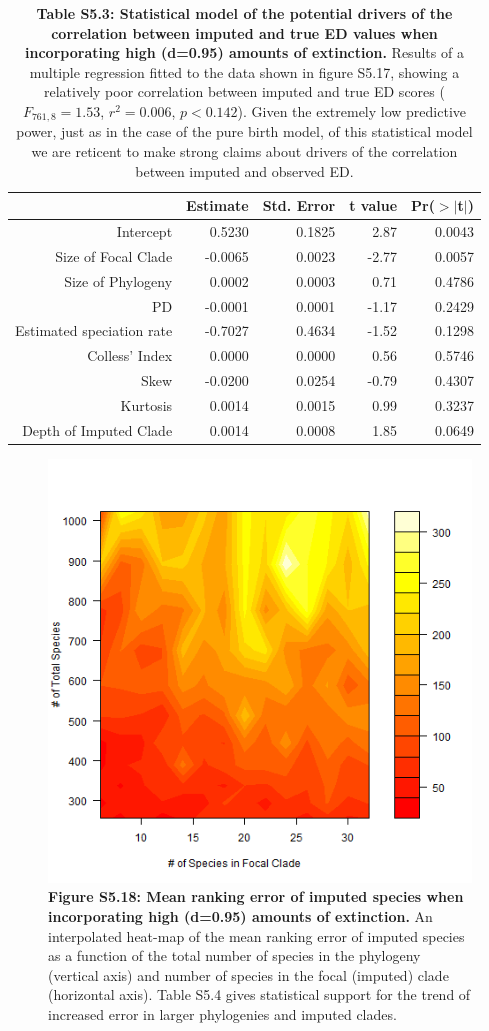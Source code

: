 \documentclass[10pt,english]{article}
\begin{document}
\begin{table}[ht]
  \centering
  \begin{tabular}{rrrrr}
    \hline
    & Estimate & Std. Error & t value & Pr($>$$|$t$|$) \\
    \hline
    Intercept & 0.5230 & 0.1825 & 2.87 & 0.0043 \\
    Size of Focal Clade & -0.0065 & 0.0023 & -2.77 & 0.0057 \\
    Size of Phylogeny & 0.0002 & 0.0003 & 0.71 & 0.4786 \\
    PD & -0.0001 & 0.0001 & -1.17 & 0.2429 \\
    Estimated speciation rate & -0.7027 & 0.4634 & -1.52 & 0.1298 \\
    Colless' Index & 0.0000 & 0.0000 & 0.56 & 0.5746 \\
    Skew & -0.0200 & 0.0254 & -0.79 & 0.4307 \\
    Kurtosis & 0.0014 & 0.0015 & 0.99 & 0.3237 \\
    Depth of Imputed Clade & 0.0014 & 0.0008 & 1.85 & 0.0649 \\
    \hline
\end{tabular}
\caption*{\textbf{Table S5.3: Statistical model of the potential drivers of the
    correlation between imputed and true ED values when incorporating high
    (d=0.95) amounts of extinction.} Results of a multiple regression fitted to
    the data shown in figure S5.17, showing a relatively poor correlation
    between imputed and true ED scores ($F_{761,8} = 1.53$, $r^{2} = 0.006$, $p
    < 0.142$). Given the extremely low predictive power, just as in the case of
    the pure birth model, of this statistical model we are reticent to make
    strong claims about drivers of the correlation between imputed and observed
    ED.}
\end{table}

\begin{figure}[!ht]
  \center
  \includegraphics[width=.5\textwidth]{../figures/rankingErrorHighExtinction.png}
  \caption*{\textbf{Figure S5.18: Mean ranking error of imputed species when
  incorporating high (d=0.95) amounts of extinction.} An interpolated heat-map of
  the mean ranking error of imputed species as a function of the total number of
  species in the phylogeny (vertical axis) and number of species in the focal
  (imputed) clade (horizontal axis). Table S5.4 gives statistical support for
  the trend of increased error in larger phylogenies and imputed clades.}
\end{figure}
\end{document}
